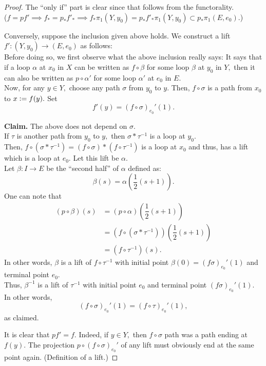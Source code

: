 \documentclass[12pt]{article}
\newenvironment{blockquote}
{\begin{mdframed}[skipabove=0pt, skipbelow=0pt, innertopmargin=4pt, innerbottommargin=4pt, bottomline=false,topline=false,rightline=false, linewidth=2pt]}
{\end{mdframed}}
\begin{document}
\begin{proof} 
	The ``only if'' part is clear since that follows from the functorality. \\
	($f = pf' \implies f_* = p_*f'_* \implies f_*\pi_1(Y, y_0) = p_*f'_*\pi_1(Y, y_0) \subset p_*\pi_1(E, e_0).$)

	Conversely, suppose the inclusion given above holds. We construct a lift $f':(Y, y_0) \to (E, e_0)$ as follows:\\
	Before doing so, we first observe what the above inclusion really says: It says that if a loop $\alpha$ at $x_0$ in $X$ can be written as $f\circ\beta$ for some loop $\beta$ at $y_0$ in $Y,$ then it can also be written as $p\circ\alpha'$ for some loop $\alpha'$ at $e_0$ in $E.$\\
	Now, for any $y \in Y,$ choose any path $\sigma$ from $y_0$ to $y.$ Then, $f\circ\sigma$ is a path from $x_0$ to $x \vcentcolon= f(y).$ Set
	\begin{equation*} 
		f'(y) = (f\circ\sigma)_{e_0}'(1).
	\end{equation*}
	\begin{blockquote}
		\textbf{Claim.} The above does not depend on $\sigma.$\\
		If $\tau$ is another path from $y_0$ to $y,$ then $\sigma*\tau^{-1}$ is a loop at $y_0.$\\
		Then, $f\circ(\sigma*\tau^{-1}) = (f\circ\sigma)*(f\circ\tau^{-1})$ is a loop at $x_0$ and thus, has a lift which is a loop at $e_0.$ Let this lift be $\alpha.$ \\
		Let $\beta:I\to E$ be the ``second half'' of $\alpha$ defined as:
		\begin{equation*} 
			\beta(s) = \alpha\left(\dfrac{1}{2}(s + 1)\right).
		\end{equation*}
		One can note that
		\begin{align*} 
			(p\circ\beta)(s) &= (p\circ\alpha)\left(\dfrac{1}{2}(s + 1)\right)\\
			&= (f\circ(\sigma*\tau^{-1}))\left(\dfrac{1}{2}(s + 1)\right)\\
			&= (f\circ\tau^{-1})(s).
		\end{align*}
		In other words, $\beta$ is a lift of $f\circ\tau^{-1}$ with initial point $\beta(0) = (f\sigma)_{e_0}'(1)$ and terminal point $e_0.$\\
		Thus, $\beta^{-1}$ is a lift of $\tau^{-1}$ with initial point $e_0$ and terminal point $(f\sigma)_{e_0}'(1).$ In other words,
		\begin{equation*} 
			(f\circ\sigma)_{e_0}'(1) = (f\circ\tau)_{e_0}'(1),
		\end{equation*}
		as claimed.
	\end{blockquote}
	It is clear that $pf' = f.$ Indeed, if $y \in Y,$ then $f\circ\sigma$ path was a path ending at $f(y).$ The projection $p\circ(f\circ\sigma)_{e_0}'$ of any lift must obviously end at the same point again. (Definition of a lift.)


\end{proof}
\end{document}
